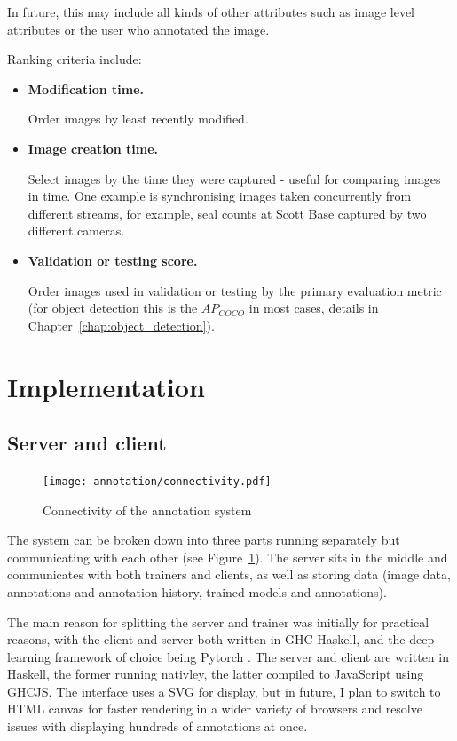 In future, this may include all kinds of other attributes such as image level attributes or the user who annotated the image.

Ranking criteria include:

\begin{itemize}
    \item {\bf Modification time.} \par
Order images by least recently modified.
    \item {\bf Image creation time. } \par
Select images by the time they were captured - useful for comparing images in time. One example is synchronising images taken concurrently from different streams, for example, seal counts at Scott Base captured by two different cameras.
    \item {\bf Validation or testing score. } \par
Order images used in validation or testing by the primary evaluation metric (for object detection this is the $AP_{COCO}$ in most cases, details in Chapter~\ref{chap:object_detection}).
\end{itemize}

\section {Implementation}

\subsection{Server and client}

\begin{figure}[htb!]
  \centering
  \texttt{[image: annotation/connectivity.pdf]}
  \caption{Connectivity of the annotation system}  
  \label{fig:connectivity}
\end{figure}

The system can be broken down into three parts running separately but communicating with each other (see Figure~\ref{fig:connectivity}). The server sits in the middle and communicates with both trainers and clients, as well as storing data (image data, annotations and annotation history, trained models and annotations).

The main reason for splitting the server and trainer was initially for practical reasons, with the client and server both written in \gls{GHC} Haskell, and the deep learning framework of choice being Pytorch \cite{Paszke2017}. The server and client are written in Haskell, the former running nativley, the latter compiled to JavaScript using \gls{GHCJS}. The interface uses a \gls{SVG} for display, but in future, I plan to switch to \gls{HTML} canvas for faster rendering in a wider variety of browsers and resolve issues with displaying hundreds of annotations at once.

